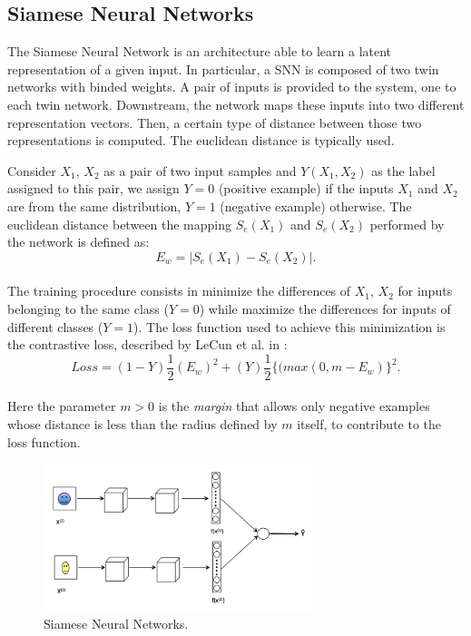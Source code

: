 \subsection{Siamese Neural Networks}
\label{ssec:siamese}
The Siamese Neural Network is an architecture able to learn a latent representation of a given input. In particular, a SNN is composed of two twin networks with binded weights. A pair of inputs is provided to the system, one to each twin network. Downstream, the network maps these inputs into two different representation vectors. Then, a certain type of distance between those two representations is computed. The euclidean distance is typically used. 

Consider $X_1$, $X_2$ as a pair of two input samples and $Y(X_1, X_2)$ as the label assigned to this pair, we assign $Y = 0$ (positive example) if the inputs $X_1$ and $X_2$ are from the same distribution, $Y = 1$ (negative example) otherwise. The euclidean distance between the mapping $S_e(X_1)$ and $S_e(X_2)$ performed by the network is defined as:
\begin{equation}
E_w = \left|{S_e (X_1) - S_e (X_2)}\right|.
\end{equation}\\
The training procedure consists in minimize the differences of $X_1$, $X_2$ for inputs belonging to the same class ($Y = 0$) while maximize the differences for inputs of different classes ($Y = 1$).
The loss function used to achieve this minimization is the contrastive loss, described by LeCun et al. in \cite{chopra2005learning}:
\begin{equation}
Loss = (1 - Y)\frac{1}{2}(E_w)^2 + (Y)\frac{1}{2}\{(max(0, m - E_w)\}^2 .
\end{equation}\\
Here the parameter $m > 0$ is the \textit{margin} that allows only negative examples whose distance is less than the radius defined by $m$ itself, to contribute to the loss function.


\begin{figure}[h]
	\centering
	\includegraphics[width=0.7\textwidth]{img/siamese_basic.png}
	\caption[Siamese DNN]{Siamese Neural Networks.}
	\label{fig:siamese}
\end{figure}


